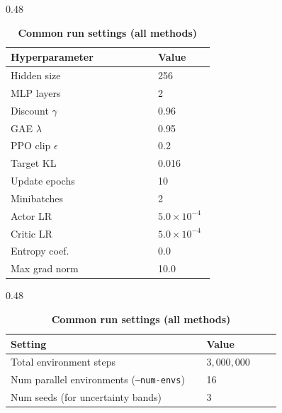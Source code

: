 \documentclass{article}
\theoremstyle{plain}
\theoremstyle{definition}
\theoremstyle{remark}
\begin{document}
\clearpage
\begin{table}[t]
\caption{\textbf{Key method hyperparameters (3/3)} Common run settings listed here.}
\label{tab:hparams-page3}
\centering
\begin{subtable}[t]{0.48\textwidth}
\caption{\textsc{HAPPO}}
\label{tab:hparams-happo}
\centering
\scriptsize
\setlength{\tabcolsep}{4pt}
\renewcommand{\arraystretch}{1.08}
\begin{tabular}{@{}p{0.68\linewidth}p{0.26\linewidth}@{}}
\toprule
\textbf{Hyperparameter} & \textbf{Value} \\
\midrule
Hidden size & 256 \\
MLP layers & 2 \\
Discount $\gamma$ & 0.96 \\
GAE $\lambda$ & 0.95 \\
PPO clip $\epsilon$ & 0.2 \\
Target KL & 0.016 \\
Update epochs & 10 \\
Minibatches & 2 \\
Actor LR & $5.0\times 10^{-4}$ \\
Critic LR & $5.0\times 10^{-4}$ \\
Entropy coef. & 0.0 \\
Max grad norm & 10.0 \\
\bottomrule
\end{tabular}
\end{subtable}\hfill
\begin{subtable}[t]{0.48\textwidth}
\caption{\textbf{Common run settings (all methods)}}
\label{tab:common-run-settings}
\centering
\scriptsize
\setlength{\tabcolsep}{4pt}
\renewcommand{\arraystretch}{1.08}
\begin{tabular}{@{}p{0.68\linewidth}p{0.26\linewidth}@{}}
\toprule
\textbf{Setting} & \textbf{Value} \\
\midrule
Total environment steps & $3{,}000{,}000$ \\
Num parallel environments (\texttt{--num-envs}) & 16 \\
Num seeds (for uncertainty bands) & 3 \\
\bottomrule
\end{tabular}
\end{subtable}
\end{table}
\end{document}
